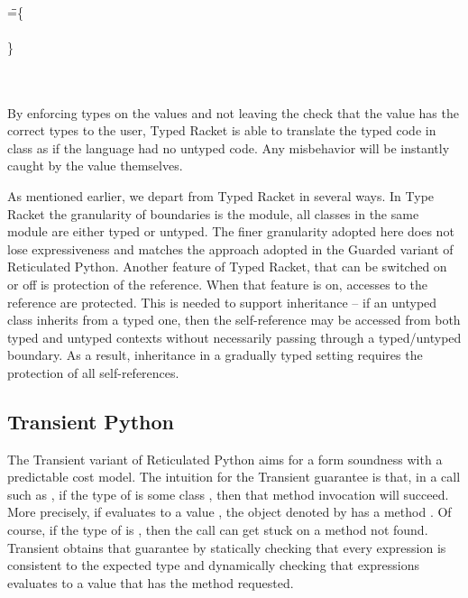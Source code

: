 \documentclass[acmsmall, anonymous, authordraft, review]{acmart} %
\begin{document}

\medskip
\begin{minipage}{\textwidth}
\begin{tabbing}
\HS\HS \KCall{\New\A{}}\m{\BehCast\any{\New\C{}}}\any\any \\
\HS\HS\HS\HS\HS\HS\HS\HS\HS\HS\HS\HS\HS\HS\HS\HS\HS\HS\HS\HS\HS
\WHERE\HS\K\HS=\HS\=
\class\= \A \{\\
\>\HS \Mdef\m\x\any\any{ ~ \BehCast\any{\KCall{\New\D{}}\m{\BehCast\D\x}{\D}\D~}} \\
\>\}\\
 \>  \Class\D{}{\Mdef\m\x\D\D{\KCall\x\m\x\D\D}} \\
 \>  \Class{\C}{}{\Mdef\m\x{\any}{\any}{\x}} \\
\end{tabbing}
\end{minipage}
\medskip


\noindent By enforcing types on the values and not leaving the check that
the value has the correct types to the user, Typed Racket is able to
translate the typed code in class \D as if the language had no untyped
code. Any misbehavior will be instantly caught by the value themselves.

As mentioned earlier, we depart from Typed Racket in several ways. In Type
Racket the granularity of boundaries is the module, all classes in the same
module are either typed or untyped.  The finer granularity adopted here does
not lose expressiveness and matches the approach adopted in the Guarded
variant of Reticulated Python. Another feature of Typed Racket, that can be
switched on or off is protection of the \this reference. When that feature
is on, accesses to the \this reference are protected. This is needed to
support inheritance -- if an untyped class inherits from a typed one, then
the self-reference may be accessed from both typed and untyped contexts
without necessarily passing through a typed/untyped boundary. As a result,
inheritance in a gradually typed setting requires the protection of all
self-references.


\subsection{Transient Python}

The Transient variant of Reticulated Python aims for a form soundness with a
predictable cost model. The intuition for the Transient guarantee is that,
in a call such as \Call\e\m\ep, if the type of \e is some class \C, then that
method invocation will succeed. More precisely, if \e evaluates to a value
\a, the object denoted by \a has a method \m. Of course, if the type of \e is
\any, then the call can get stuck on a method not found. Transient obtains
that guarantee by statically checking that every expression is consistent to
the expected type and dynamically checking that expressions evaluates to a
value that has the method requested.
\end{document}
